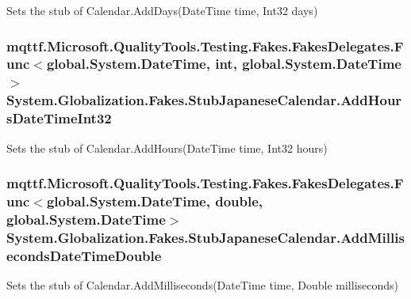 Sets the stub of Calendar.\-Add\-Days(\-Date\-Time time, Int32 days)

\hypertarget{class_system_1_1_globalization_1_1_fakes_1_1_stub_japanese_calendar_afccd6983bb04e94e322c7569f0393655}{
\subsubsection[{Add\-Hours\-Date\-Time\-Int32}]{\setlength{\rightskip}{0pt plus 5cm}mqttf.\-Microsoft.\-Quality\-Tools.\-Testing.\-Fakes.\-Fakes\-Delegates.\-Func$<$global.\-System.\-Date\-Time, int, global.\-System.\-Date\-Time$>$ System.\-Globalization.\-Fakes.\-Stub\-Japanese\-Calendar.\-Add\-Hours\-Date\-Time\-Int32}}\label{class_system_1_1_globalization_1_1_fakes_1_1_stub_japanese_calendar_afccd6983bb04e94e322c7569f0393655}


Sets the stub of Calendar.\-Add\-Hours(\-Date\-Time time, Int32 hours)

\hypertarget{class_system_1_1_globalization_1_1_fakes_1_1_stub_japanese_calendar_aea756171fdbbaac9a045b1a8ac46a950}{
\subsubsection[{Add\-Milliseconds\-Date\-Time\-Double}]{\setlength{\rightskip}{0pt plus 5cm}mqttf.\-Microsoft.\-Quality\-Tools.\-Testing.\-Fakes.\-Fakes\-Delegates.\-Func$<$global.\-System.\-Date\-Time, double, global.\-System.\-Date\-Time$>$ System.\-Globalization.\-Fakes.\-Stub\-Japanese\-Calendar.\-Add\-Milliseconds\-Date\-Time\-Double}}\label{class_system_1_1_globalization_1_1_fakes_1_1_stub_japanese_calendar_aea756171fdbbaac9a045b1a8ac46a950}


Sets the stub of Calendar.\-Add\-Milliseconds(\-Date\-Time time, Double milliseconds)

